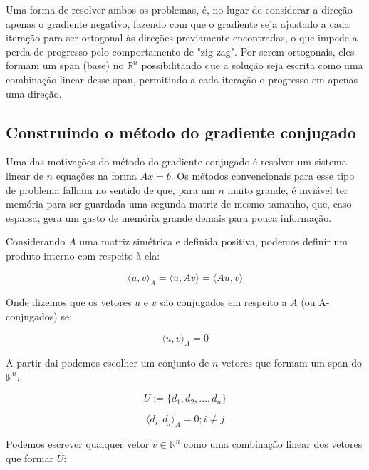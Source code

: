 Uma forma de resolver ambos os problemas, é, no lugar de considerar a direção
apenas o gradiente negativo, fazendo com que o gradiente seja ajustado a cada
iteração para ser ortogonal às direções previamente encontradas, o que impede
a perda de progresso pelo comportamento de "zig-zag". Por serem ortogonais,
eles formam um span (base) no \( \mathbb{R}^n \) possibilitando que a solução
seja escrita como uma combinação linear desse span, permitindo a cada iteração
o progresso em apenas uma direção.

\subsection{Construindo o método do gradiente conjugado}

Uma das motivações do método do gradiente conjugado \cite{bonnans2006numerical}
\cite{1987polyak} é resolver um sistema linear de \(n\) equações na forma \(Ax = b \).
Os métodos convencionais para esse tipo de problema falham no sentido de que, para um
\(n\) muito grande, é inviável ter memória para ser guardada uma segunda matriz de
mesmo tamanho, que, caso esparsa, gera um gasto de memória grande demais para pouca
informação.

Considerando \(A\) uma matriz simétrica e definida positiva, podemos definir um produto
interno com respeito à ela:

\begin{equation}
\langle u, v \rangle_A = \langle u, Av \rangle =  \langle Au, v \rangle 
\end{equation}

Onde dizemos que os vetores \(u\) e \(v\) são conjugados em respeito a \(A\) (ou A-conjugados) se:

\begin{equation}
\label{aortogonal}
\langle u, v \rangle_A = 0
\end{equation}

A partir dai podemos escolher um conjunto de \(n\) vetores que formam um span do
\( \mathbb{R}^n \):

\begin{equation}
U := \{d_1, d_2, ..., d_n\}
\end{equation}

\begin{equation}
\label{gc_prod_interno}
\langle d_i, d_j \rangle_A = 0; i \ne j
\end{equation}

Podemos escrever qualquer vetor \(v \in \mathbb{R}^n\) como uma combinação linear dos
vetores que formar \(U\):

